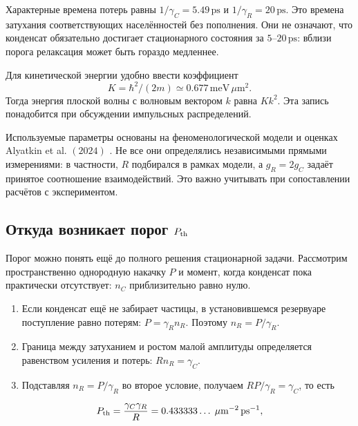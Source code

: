\documentclass[12pt,a4paper]{article}
\begin{document}
Характерные времена потерь равны $1/\gamma_{C}=5.49\,\mathrm{ps}$ и $1/\gamma_{R}=20\,\mathrm{ps}$. Это времена затухания соответствующих населённостей без пополнения. Они не означают, что конденсат обязательно достигает стационарного состояния за $5\text{--}20\,\mathrm{ps}$: вблизи порога релаксация может быть гораздо медленнее.

Для кинетической энергии удобно ввести коэффициент
\[
K=\hbar^{2}/(2m)\simeq 0.677\,\mathrm{meV}\,\mu\mathrm m^{2}.
\]
Тогда энергия плоской волны с волновым вектором $k$ равна $K k^{2}$. Эта запись понадобится при обсуждении импульсных распределений.

Используемые параметры основаны на феномено\-логической модели и оценках Alyatkin et al. $(2024)$ \cite{ref3}. Не все они определялись независимыми прямыми измерениями: в частности, $R$ подбирался в рамках модели, а $g_{R}=2g_{C}$ задаёт принятое соотношение взаимодействий. Это важно учитывать при сопоставлении расчётов с экспериментом.

\subsection{\texorpdfstring{Откуда возникает порог $P_{\rm th}$}{Откуда возникает порог Pth}}\label{sec:2.5}

Порог можно понять ещё до полного решения стационарной задачи. Рассмотрим пространственно однородную накачку $P$ и момент, когда конденсат пока практически отсутствует: $n_{C}$ приблизительно равно нулю.

\begin{enumerate}\raggedright\setlength{\itemsep}{3pt}\setlength{\parsep}{0pt}

\item Если конденсат ещё не забирает частицы, в установившемся резервуаре поступление равно потерям: $P=\gamma_{R} n_{R}$. Поэтому $n_{R}=P/\gamma_{R}$.

\item Граница между затуханием и ростом малой амплитуды определяется равенством усиления и потерь: $R n_{R}=\gamma_{C}$.

\item Подставляя $n_{R}=P/\gamma_{R}$ во второе условие, получаем $R P/\gamma_{R}=\gamma_{C}$, то есть

\end{enumerate}

\begin{equation}\label{eq:5}
P_{\rm th}=\frac{\gamma_C\gamma_R}{R}=0.433333\ldots\;\mu\mathrm m^{-2}\,\mathrm{ps}^{-1},\end{equation}
\end{document}
